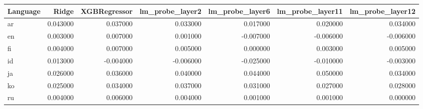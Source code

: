 \begin{tabular}{lrrrrrr}
\toprule
Language & Ridge & XGBRegressor & lm_probe_layer2 & lm_probe_layer6 & lm_probe_layer11 & lm_probe_layer12 \\
\midrule
ar & 0.043000 & 0.037000 & 0.033000 & 0.017000 & 0.020000 & 0.034000 \\
en & 0.003000 & 0.007000 & 0.001000 & -0.007000 & -0.006000 & -0.006000 \\
fi & 0.004000 & 0.007000 & 0.005000 & 0.000000 & 0.003000 & 0.005000 \\
id & 0.013000 & -0.004000 & -0.006000 & -0.025000 & -0.010000 & -0.003000 \\
ja & 0.026000 & 0.036000 & 0.040000 & 0.044000 & 0.050000 & 0.034000 \\
ko & 0.025000 & 0.034000 & 0.037000 & 0.031000 & 0.027000 & 0.028000 \\
ru & 0.004000 & 0.006000 & 0.004000 & 0.001000 & 0.001000 & 0.000000 \\
\bottomrule
\end{tabular}
